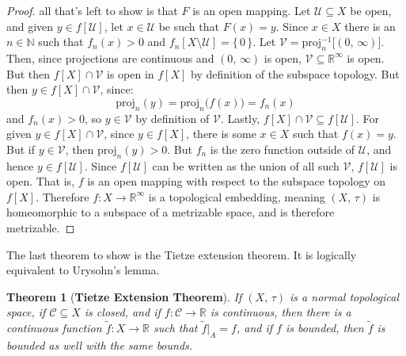 \documentclass{article}
\theoremstyle{plain}
\newtheorem{theorem}{Theorem}[section]
\begin{document}
\begin{proof}
            all that's left to show is that $F$ is an open mapping.
            Let $\mathcal{U}\subseteq{X}$ be open, and given
            $y\in{f}[\mathcal{U}]$, let $x\in\mathcal{U}$ be such that
            $F(x)=y$. Since $x\in{X}$ there is an $n\in\mathbb{N}$ such that
            $f_{n}(x)>0$ and $f_{n}[X\setminus\mathcal{U}]=\{\,0\,\}$.
            Let $\mathcal{V}=\textrm{proj}_{n}^{-1}\big[(0,\,\infty)\big]$.
            Then, since projections are continuous and $(0,\,\infty)$ is open,
            $\mathcal{V}\subseteq\mathbb{R}^{\infty}$ is open. But then
            $f[X]\cap\mathcal{V}$ is open in $f[X]$ by definition of the
            subspace topology. But then $y\in{f}[X]\cap\mathcal{V}$, since:
            \begin{equation}
                \textrm{proj}_{n}(y)
                =\textrm{proj}_{n}\big(f(x)\big)
                =f_{n}(x)
            \end{equation}
            and $f_{n}(x)>0$, so $y\in\mathcal{V}$ by definition of
            $\mathcal{V}$. Lastly,
            $f[X]\cap\mathcal{V}\subseteq{f}[\mathcal{U}]$. For given
            $y\in{f}[X]\cap\mathcal{V}$, since $y\in{f}[X]$, there is some
            $x\in{X}$ such that $f(x)=y$. But if
            $y\in\mathcal{V}$, then $\textrm{proj}_{n}(y)>0$. But
            $f_{n}$ is the zero function outside of $\mathcal{U}$, and hence
            $y\in{f}[\mathcal{U}]$. Since $f[\mathcal{U}]$ can be written as
            the union of all such $\mathcal{V}$, $f[\mathcal{U}]$ is open.
            That is, $f$ is an open mapping with respect to the subspace
            topology on $f[X]$. Therefore $f:X\rightarrow\mathbb{R}^{\infty}$
            is a topological embedding, meaning $(X,\,\tau)$ is homeomorphic
            to a subspace of a metrizable space, and is therefore metrizable.
        \end{proof}
        The last theorem to show is the Tietze extension theorem. It is
        logically equivalent to Urysohn's lemma.
        \begin{theorem}[\textbf{Tietze Extension Theorem}]
            If $(X,\,\tau)$ is a normal topological space, if
            $\mathcal{C}\subseteq{X}$ is closed, and if
            $f:\mathcal{C}\rightarrow\mathbb{R}$ is continuous, then there is
            a continuous function $\tilde{f}:X\rightarrow\mathbb{R}$ such that
            $\tilde{f}|_{A}=f$, and if $f$ is bounded, then $\tilde{f}$ is
            bounded as well with the same bounds.
        \end{theorem}
\end{document}

